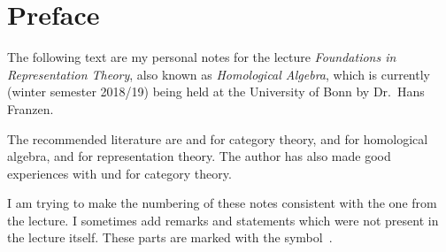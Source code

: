 \chapter{Preface}

The following text are my personal notes for the lecture \emph{Foundations in Representation Theory}, also known as \emph{Homological Algebra}, which is currently (winter semester 2018/19) being held at the University of Bonn by Dr.\ Hans Franzen.

The recommended literature are \cite{Working} and \cite{Schubert} for category theory, \cite[Chapter~1]{SheavesManifolds} and \cite{Weibel} for homological algebra, and \cite{Elements} for representation theory.
The author has also made good experiences with \cite{BasicCategory} und \cite{Brandenburg} for category theory.

I am trying to make the numbering of these notes consistent with the one from the lecture.
I sometimes add remarks and statements which were not present in the lecture itself.
These parts are marked with the symbol~\textsuperscript{\extrasymbol}.
